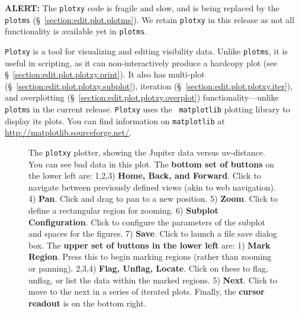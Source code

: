 \vspace{5cm}

{\bf ALERT:} The {\tt plotxy} code is fragile and slow, and is being replaced by the {\tt plotms} (\S~\ref{section:edit.plot.plotms}). We retain {\tt plotxy} in this release as not all functionality is available yet in {\tt plotms}.


{\tt Plotxy} is a tool for visualizing and editing visibility
data. Unlike {\tt plotms}, it is useful in scripting, as it can
non-interactively produce a hardcopy plot (see
\S~\ref{section:edit.plot.plotxy.print}). It also has multi-plot
(\S~\ref{section:edit.plot.plotxy.subplot}), iteration
(\S~\ref{section:edit.plot.plotxy.iter}), and overplotting
(\S~\ref{section:edit.plot.plotxy.overplot}) functionality---unlike
{\tt plotms} in the current release. {\tt Plotxy} uses the {\tt
  matplotlib} plotting library to display its plots. You can find
information on {\tt matplotlib} at
\url{http://matplotlib.sourceforge.net/}.







\begin{figure}[h!]
\begin{center}
\caption{\label{fig:matplotlib}The {\tt plotxy} plotter, showing the
  Jupiter data versus uv-distance.  You can see bad data in this plot.
  The {\bf bottom set of buttons} on the
  lower left are: 1,2,3) {\bf Home, Back, and Forward}. Click to
  navigate between previously defined views (akin to web navigation).
  4) {\bf Pan}. Click and drag to pan to a new position. 5) {\bf
  Zoom}. Click to define a rectangular region for zooming. 6) {\bf
  Subplot Configuration}. Click to configure the parameters of the
  subplot and spaces for the figures. 7) {\bf Save}. Click to launch a
  file save dialog box.  The {\bf upper set of buttons in the lower left} are:
  1) {\bf Mark Region}. Press this to begin marking regions (rather than
  zooming or panning).  2,3,4) {\bf Flag, Unflag, Locate}.  Click on these
  to flag, unflag, or list the data within the marked regions.  5) {\bf Next}.
  Click to move to the next in a series of iterated plots.
  Finally, the {\bf cursor readout} is on the bottom right.}
\hrulefill
\end{center}
\end{figure}

